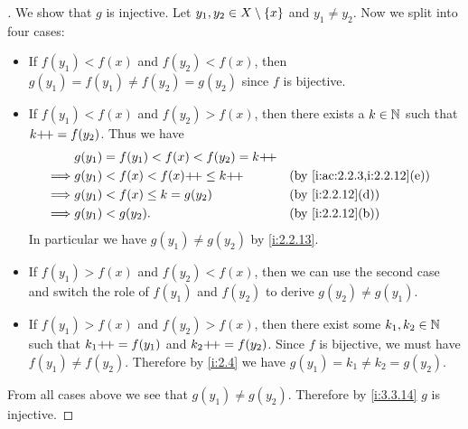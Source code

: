 \begin{proof}[]
  We show that \(g\) is injective.
  Let \(y_1, y_2 \in X \setminus \left\lbrace x\right\rbrace\) and \(y_1 \neq y_2\).
  Now we split into four cases:
  \begin{itemize}
    \item If \(f(y_1) < f(x)\) and \(f(y_2) < f(x)\), then \(g(y_1) = f(y_1) \neq f(y_2) = g(y_2)\) since \(f\) is bijective.
    \item If \(f(y_1) < f(x)\) and \(f(y_2) > f(x)\), then there exists a \(k \in \mathbb{N}\) such that \(k{+}\!{+} = f(y_2)\).
          Thus we have
          \begin{align*}
                     & g(y_1) = f(y_1) < f(x) < f(y_2) = k\pp                                  \\
            \implies & g(y_1) < f(x) < f(x)\pp \leq k\pp      &  & \by{i:ac:2.2.3,i:2.2.12}[e] \\
            \implies & g(y_1) < f(x) \leq k = g(y_2)          &  & \by{i:2.2.12}[d]            \\
            \implies & g(y_1) < g(y_2).                       &  & \by{i:2.2.12}[b]
          \end{align*}
          In particular we have \(g(y_1) \neq g(y_2)\) by \cref{i:2.2.13}.
    \item If \(f(y_1) > f(x)\) and \(f(y_2) < f(x)\), then we can use the second case and switch the role of \(f(y_1)\) and \(f(y_2)\) to derive \(g(y_2) \neq g(y_1)\).
    \item If \(f(y_1) > f(x)\) and \(f(y_2) > f(x)\), then there exist some \(k_1, k_2 \in \mathbb{N}\) such that \(k_1{+}\!{+} = f(y_1)\) and \(k_2{+}\!{+} = f(y_2)\).
          Since \(f\) is bijective, we must have \(f(y_1) \neq f(y_2)\).
          Therefore by \cref{i:2.4} we have \(g(y_1) = k_1 \neq k_2 = g(y_2)\).
  \end{itemize}
  From all cases above we see that \(g(y_1) \neq g(y_2)\).
  Therefore by \cref{i:3.3.14} \(g\) is injective.


\end{proof}
